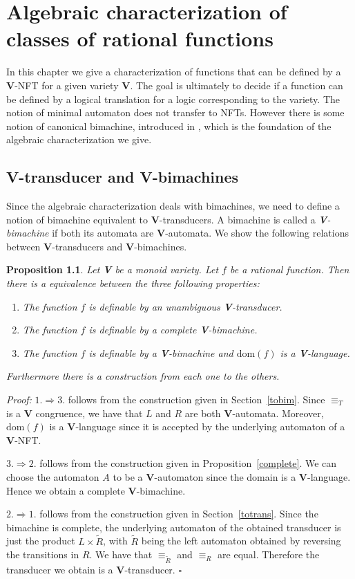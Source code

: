 \documentclass[12pt]{report}
\newtheorem{prp}{Proposition}[section]
\theoremstyle{definition}
\theoremstyle{remark}
\newenvironment{prf}
{\textit{Proof:}}
{\hfill $\square$\\}
\begin{document}
\chapter{Algebraic characterization of classes of rational functions}

In this chapter we give a characterization of functions that can be defined by a \textbf V-NFT for a given variety \textbf V. The goal is ultimately to decide if a function can be defined by a logical translation for a logic corresponding to the variety.
The notion of minimal automaton does not transfer to NFTs.
However there is some notion of canonical bimachine, introduced in \cite{reutenauers91}, which is the foundation of the algebraic characterization we give.

\section{V-transducer and V-bimachines}
Since the algebraic characterization deals with bimachines, we need to define a notion of bimachine equivalent to \textbf V-transducers.
A bimachine is called a \emph{\textbf V-bimachine} if both its automata are \textbf V-automata.
We show the following relations between \textbf V-transducers and \textbf V-bimachines.

\begin{prp}
\label{prp3}
Let \textbf V be a monoid variety.
Let $f$ be a rational function.
Then there is a equivalence between the three following properties:
\begin{enumerate}
\item The function $f$ is definable by an unambiguous \textbf V-transducer.
\item The function $f$ is definable by a complete \textbf V-bimachine.
\item The function $f$ is definable by a \textbf V-bimachine and $\mathrm{dom}(f)$ is a \textbf V-language.
\end{enumerate}
Furthermore there is a construction from each one to the others.
\end{prp}

\begin{prf}
$1.\Rightarrow 3.$ follows from the construction given in Section~\ref{tobim}.
Since $\equiv_T$ is a \textbf V congruence, we have that $L$ and $R$ are both \textbf V-automata. Moreover, $\mathrm{dom}(f)$ is a \textbf V-language since it is accepted by the underlying automaton of a \textbf V-NFT.

$3.\Rightarrow 2.$ follows from the construction given in Proposition~\ref{complete}. We can choose the automaton $A$ to be a \textbf V-automaton since the domain is a \textbf V-language. Hence we obtain a complete \textbf V-bimachine.

$2.\Rightarrow 1.$ follows from the construction given in Section~\ref{totrans}. Since the bimachine is complete, the underlying automaton of the obtained transducer is just the product $L\times \tilde R$, with $\tilde R$ being the left automaton obtained by reversing the transitions in $R$. We have that $\equiv_{\tilde R}$ and $\equiv_R$ are equal. Therefore the transducer we obtain is a \textbf V-transducer.
\end{prf}
\end{document}
